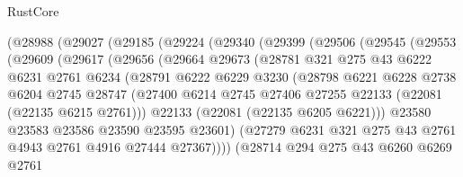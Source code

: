 \begin{lexlean}{RustCore}
\begin{coremodule}
      (@28988
        (@29027
          (@29185
            (@29224
              (@29340
                (@29399
                  (@29506
                    (@29545
                      (@29553
                        (@29609
                          (@29617
                            (@29656
                              (@29664
                                @29673
                                (@28781
                                  @321
                                  @275
                                  @43
                                  @6222
                                  @6231
                                  @2761
                                  @6234
                                  (@28791
                                    @6222
                                    @6229
                                    @3230
                                    (@28798
                                      @6221
                                      @6228
                                      @2738
                                      @6204
                                      @2745
                                      @28747
                                      (@27400
                                        @6214
                                        @2745
                                        @27406
                                        @27255
                                        @22133
                                        (@22081 (@22135 @6215 @2761)))
                                      @22133
                                      (@22081 (@22135 @6205 @6221)))
                                    @23580
                                    @23583
                                    @23586
                                    @23590
                                    @23595
                                    @23601)
                                  (@27279
                                    @6231
                                    @321
                                    @275
                                    @43
                                    @2761
                                    @4943
                                    @2761
                                    @4916
                                    @27444
                                    @27367))))
                            (@28714
                              @294
                              @275
                              @43
                              @6260
                              @6269
                              @2761

\end{coremodule}
\end{lexlean}
